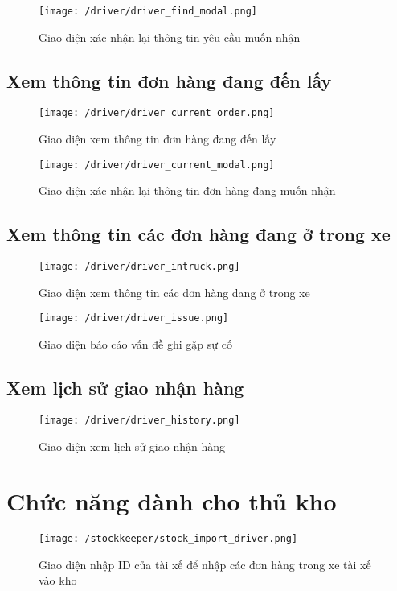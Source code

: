 				\begin{figure}[H]
					\texttt{[image: /driver/driver\_find\_modal.png]}
					\centering
					\caption{Giao diện xác nhận lại thông tin yêu cầu muốn nhận}
				\end{figure}
			
			\subsection{Xem thông tin đơn hàng đang đến lấy}
				\begin{figure}[H]
					\texttt{[image: /driver/driver\_current\_order.png]}
					\centering
					\caption{Giao diện xem thông tin đơn hàng đang đến lấy}
				\end{figure}
				
				\begin{figure}[H]
					\texttt{[image: /driver/driver\_current\_modal.png]}
					\centering
					\caption{Giao diện xác nhận lại thông tin đơn hàng đang muốn nhận}
				\end{figure}
			
			\subsection{Xem thông tin các đơn hàng đang ở trong xe}
				\begin{figure}[H]
					\texttt{[image: /driver/driver\_intruck.png]}
					\centering
					\caption{Giao diện xem thông tin các đơn hàng đang ở trong xe}
				\end{figure}
			
				\begin{figure}[H]
					\texttt{[image: /driver/driver\_issue.png]}
					\centering
					\caption{Giao diện báo cáo vấn đề ghi gặp sự cố}
				\end{figure}
			
			\subsection{Xem lịch sử giao nhận hàng}
				\begin{figure}[H]
					\texttt{[image: /driver/driver\_history.png]}
					\centering
					\caption{Giao diện xem lịch sử giao nhận hàng}
				\end{figure}
			
		\section{Chức năng dành cho thủ kho}
				\begin{figure}[H]
					\texttt{[image: /stockkeeper/stock\_import\_driver.png]}
					\centering
					\caption{Giao diện nhập ID của tài xế để nhập các đơn hàng trong xe tài xế vào kho}
				\end{figure}
			
